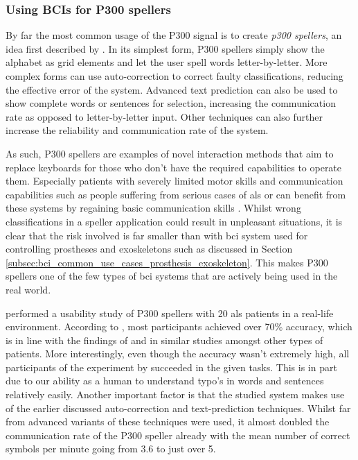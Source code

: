 \subsubsection{Using BCIs for P300 spellers}
\label{subsubsec:bci_common_use_cases_bcis_replace_eye_tracking_p300_spellers}

By far the most common usage of the P300 signal is to create \textit{p300 spellers}, an idea first described by \citet{first_p300_speller}.
In its simplest form, P300 spellers simply show the alphabet as grid elements and let the user spell words letter-by-letter.
More complex forms can use auto-correction to correct faulty classifications, reducing the effective error of the system.
Advanced text prediction can also be used to show complete words or sentences for selection, increasing the communication rate as opposed to letter-by-letter input.
Other techniques can also further increase the reliability and communication rate of the system.

As such, P300 spellers are examples of novel interaction methods that aim to replace keyboards for those who don't have the required capabilities to operate them.
Especially patients with severely limited motor skills and communication capabilities such as people suffering from serious cases of \gls{als} or  can benefit from these systems by regaining basic communication skills \citep{p300_spellers, p300_spellers_review}.
Whilst wrong classifications in a speller application could result in unpleasant situations, it is clear that the risk involved is far smaller than with \gls{bci} system used for controlling prostheses and exoskeletons such as discussed in Section \ref{subsec:bci_common_use_cases_prosthesis_exoskeleton}.
This makes P300 spellers one of the few types of \gls{bci} systems that are actively being used in the real world.

 performed a usability study of P300 spellers with 20 \gls{als} patients in a real-life environment.
According to \citet{p300_speller_real_life}, most participants achieved over 70\% accuracy, which is in line with the findings of \citet{p300_spellers_review} and \citet{p300_speller_real_life2} in similar studies amongst other types of patients.
More interestingly, even though the accuracy wasn't extremely high, all participants of the experiment by \citet{p300_speller_real_life} succeeded in the given tasks.
This is in part due to our ability as a human to understand typo's in words and sentences relatively easily.
Another important factor is that the studied system makes use of the earlier discussed auto-correction and text-prediction techniques.
Whilst far from advanced variants of these techniques were used, it almost doubled the communication rate of the P300 speller already with the mean number of correct symbols per minute going from 3.6 to just over 5.

